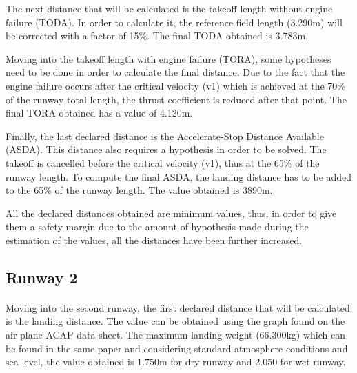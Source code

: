 		The next distance that will be calculated is the takeoff length without engine failure (TODA). In order to calculate it, the reference field length (3.290m) will be corrected with a factor of 15\%.  The final TODA obtained is 3.783m.
		
		
		Moving into the takeoff length with engine failure (TORA), some hypotheses need to be done in order to calculate the final distance.  Due to the fact that the engine failure occurs after the critical velocity (v1) which is achieved at the 70\% of the runway total length, the thrust coefficient is reduced after that point. The final TORA obtained has a value of 4.120m.
		
		
		Finally, the last declared distance is the Accelerate-Stop Distance Available (ASDA). This distance also requires a hypothesis in order to be solved. The takeoff is cancelled before the critical velocity (v1), thus at the 65\% of the runway length. To compute the final ASDA, the landing distance has to be added to the 65\% of the runway length. The value obtained is 3890m.  
		
		All the declared distances obtained are minimum values, thus, in order to give them a safety margin due to the amount of hypothesis made during the estimation of the values, all the distances have been further increased. 
		
		\subsection{Runway 2}
		\paragraph{}Moving into the second runway, the first declared distance that will be calculated is the landing distance. The value can be obtained using the graph found on the air plane ACAP data-sheet. The maximum landing weight (66.300kg) which can be found in the same paper and considering standard atmosphere conditions and sea level, the value obtained is 1.750m for dry runway and 2.050 for wet runway.
		

